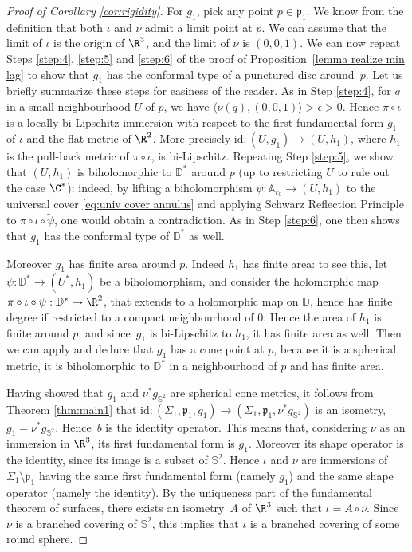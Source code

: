 \begin{proof}[Proof of Corollary \ref{cor:rigidity}]
For $g_1$, pick any point $p\in\mathfrak p_1$. We know from the definition that both $\iota$ and $\nu$ admit a limit point at $p$. We can assume that the limit of $\iota$ is the origin of $\R^3$, and the limit of $\nu$ is $(0,0,1)$. We can now repeat Steps \ref{step:4}, \ref{step:5} and \ref{step:6} of the proof of Proposition~\ref{lemma realize min lag} to show that $g_1$ has the conformal type of a punctured disc around~$p$.
Let us briefly summarize these steps for easiness of the reader.
As in Step \ref{step:4}, for $q$ in a small neighbourhood $U$ of $p$, we have $\langle\nu(q),(0,0,1)\rangle>\epsilon>0$. Hence $\pi\circ \iota$ is a locally bi-Lipschitz immersion with respect to the first fundamental form $g_1$ of $\iota$ and the flat metric of $\R^2$. More precisely $\mathrm{id}:(U,g_1)\to (U,h_1)$, where $h_1$ is the pull-back metric of $\pi\circ \iota$, is bi-Lipschitz. Repeating Step \ref{step:5}, we show that $(U,h_1)$ is biholomorphic to $\mathbb D^*$ around $p$ (up to restricting $U$ to rule out the case $\C^*$): indeed, by lifting a biholomorphism $\psi:{\mathbb A_{r_0}}\to(U,h_1)$ to the universal cover \eqref{eq:univ cover annulus} and applying Schwarz Reflection Principle to $\pi\circ\iota\circ\widetilde\psi$, one would obtain a contradiction. As in Step \ref{step:6}, one then shows that $g_1$ has the conformal type of $\mathbb D^*$ as well.

Moreover $g_1$ has finite area around $p$. Indeed $h_1$ has finite area: to see this, let $\psi:\mathbb D^*\to (U^*,h_1)$ be a biholomorphism, and consider the holomorphic map $\pi\circ \iota\circ\psi:\mathbb D^*\to\R^2$, that extends to a holomorphic map on $\mathbb D$, hence has finite degree if restricted to a compact neighbourhood of $0$. Hence the area of $h_1$ is finite around $p$, and since~$g_1$ is bi-Lipschitz to $h_1$, it has finite area as well. Then we can apply \cite[Prop.\,4]{zbMATH04034587} and deduce that $g_1$ has a cone point at $p$, because it is a spherical metric, it is biholomorphic to $\mathbb D^*$ in a neighbourhood of $p$ and has finite area.

Having showed that $g_1$ and $\nu^*g_{\mathbb S^2}$ are spherical cone metrics, it follows from Theorem \ref{thm:main1} that $\mathrm{id}:(\Sigma_1,\mathfrak p_1,g_1)\to (\Sigma_1,\mathfrak p_1,\nu^*g_{\mathbb S^2})$ is an isometry, \ie $g_1=\nu^*g_{\mathbb S^2}$. Hence~$b$ is the identity operator. This means that, considering $\nu$ as an immersion in $\R^3$, its first fundamental form is $g_1$. Moreover its shape operator is the identity, since its image is a subset of $\mathbb S^2$. Hence $\iota$ and $\nu$ are immersions of $\Sigma_1\setminus\mathfrak p_1$ having the same first fundamental form (namely $g_1$) and the same shape operator (namely the identity). By the uniqueness part of the fundamental theorem of surfaces, there exists an isometry~$A$ of $\R^3$ such that $\iota=A\circ\nu$. Since $\nu$ is a branched covering of $\mathbb S^2$, this implies that $\iota$ is a branched covering of some round sphere.
\end{proof}

